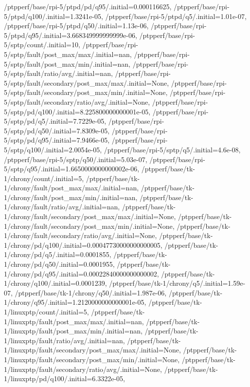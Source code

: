 {    /ptpperf/base/rpi-5/ptpd/pd/q95/.initial=0.000116625,
    /ptpperf/base/rpi-5/ptpd/q100/.initial=1.3241e-05,
    /ptpperf/base/rpi-5/ptpd/q5/.initial=1.01e-07,
    /ptpperf/base/rpi-5/ptpd/q50/.initial=1.13e-06,
    /ptpperf/base/rpi-5/ptpd/q95/.initial=3.668349999999999e-06,
    /ptpperf/base/rpi-5/sptp/count/.initial=10,
    /ptpperf/base/rpi-5/sptp/fault/post_max/max/.initial=nan,
    /ptpperf/base/rpi-5/sptp/fault/post_max/min/.initial=nan,
    /ptpperf/base/rpi-5/sptp/fault/ratio/avg/.initial=nan,
    /ptpperf/base/rpi-5/sptp/fault/secondary/post_max/max/.initial=None,
    /ptpperf/base/rpi-5/sptp/fault/secondary/post_max/min/.initial=None,
    /ptpperf/base/rpi-5/sptp/fault/secondary/ratio/avg/.initial=None,
    /ptpperf/base/rpi-5/sptp/pd/q100/.initial=8.225800000000001e-05,
    /ptpperf/base/rpi-5/sptp/pd/q5/.initial=7.7229e-05,
    /ptpperf/base/rpi-5/sptp/pd/q50/.initial=7.8309e-05,
    /ptpperf/base/rpi-5/sptp/pd/q95/.initial=7.9466e-05,
    /ptpperf/base/rpi-5/sptp/q100/.initial=2.0054e-05,
    /ptpperf/base/rpi-5/sptp/q5/.initial=4.6e-08,
    /ptpperf/base/rpi-5/sptp/q50/.initial=5.03e-07,
    /ptpperf/base/rpi-5/sptp/q95/.initial=1.6650000000000002e-06,
    /ptpperf/base/tk-1/chrony/count/.initial=5,
    /ptpperf/base/tk-1/chrony/fault/post_max/max/.initial=nan,
    /ptpperf/base/tk-1/chrony/fault/post_max/min/.initial=nan,
    /ptpperf/base/tk-1/chrony/fault/ratio/avg/.initial=nan,
    /ptpperf/base/tk-1/chrony/fault/secondary/post_max/max/.initial=None,
    /ptpperf/base/tk-1/chrony/fault/secondary/post_max/min/.initial=None,
    /ptpperf/base/tk-1/chrony/fault/secondary/ratio/avg/.initial=None,
    /ptpperf/base/tk-1/chrony/pd/q100/.initial=0.00047730000000000005,
    /ptpperf/base/tk-1/chrony/pd/q5/.initial=0.0001855,
    /ptpperf/base/tk-1/chrony/pd/q50/.initial=0.0001955,
    /ptpperf/base/tk-1/chrony/pd/q95/.initial=0.00022840000000000002,
    /ptpperf/base/tk-1/chrony/q100/.initial=0.0001239,
    /ptpperf/base/tk-1/chrony/q5/.initial=1.59e-07,
    /ptpperf/base/tk-1/chrony/q50/.initial=1.987e-06,
    /ptpperf/base/tk-1/chrony/q95/.initial=1.2120000000000001e-05,
    /ptpperf/base/tk-1/linuxptp/count/.initial=5,
    /ptpperf/base/tk-1/linuxptp/fault/post_max/max/.initial=nan,
    /ptpperf/base/tk-1/linuxptp/fault/post_max/min/.initial=nan,
    /ptpperf/base/tk-1/linuxptp/fault/ratio/avg/.initial=nan,
    /ptpperf/base/tk-1/linuxptp/fault/secondary/post_max/max/.initial=None,
    /ptpperf/base/tk-1/linuxptp/fault/secondary/post_max/min/.initial=None,
    /ptpperf/base/tk-1/linuxptp/fault/secondary/ratio/avg/.initial=None,
    /ptpperf/base/tk-1/linuxptp/pd/q100/.initial=6.3322e-05,
}
